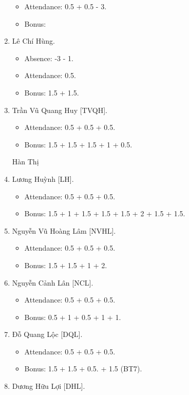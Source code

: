\documentclass{article}
\begin{document}
\begin{enumerate}
    \begin{itemize}
        \item Attendance: 0.5 + 0.5 - 3.
        \item Bonus:
    \end{itemize}
    \item {\sc Lê Chí Hùng.}
    \begin{itemize}
        \item Absence: -3 - 1.
        \item Attendance: 0.5.
        \item Bonus: 1.5 + 1.5.
    \end{itemize}
    \item {\sc Trần Vũ Quang Huy [TVQH].}
    \begin{itemize}
        \item Attendance: 0.5 + 0.5 + 0.5.
        \item Bonus: 1.5 + 1.5 + 1.5 + 1 + 0.5.
    \end{itemize}Hàn Thị
    \item {\sc Lương Huỳnh [LH].}
    \begin{itemize}
        \item Attendance: 0.5 + 0.5 + 0.5.
        \item Bonus: 1.5 + 1 + 1.5 + 1.5 + 1.5 + 2 + 1.5 + 1.5.
    \end{itemize}
    \item {\sc Nguyễn Vũ Hoàng Lâm [NVHL].}
    \begin{itemize}
        \item Attendance: 0.5 + 0.5 + 0.5.
        \item Bonus: 1.5 + 1.5 + 1 + 2.
    \end{itemize}
    \item {\sc Nguyễn Cảnh Lân [NCL].}
    \begin{itemize}
        \item Attendance: 0.5 + 0.5 + 0.5.
        \item Bonus: 0.5 + 1 + 0.5 + 1 + 1.
    \end{itemize}
    \item {\sc Đỗ Quang Lộc [DQL].}
    \begin{itemize}
        \item Attendance: 0.5 + 0.5 + 0.5.
        \item Bonus: 1.5 + 1.5 + 0.5. + 1.5 (BT7).
    \end{itemize}
    \item {\sc Dương Hữu Lợi [DHL].}
    \begin{itemize}

\end{itemize}
\end{enumerate}
\end{document}
